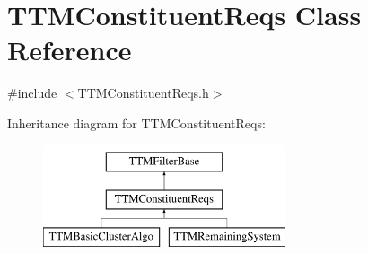 \hypertarget{classTTMConstituentReqs}{\section{T\-T\-M\-Constituent\-Reqs Class Reference}
\label{classTTMConstituentReqs}
}


{\ttfamily \#include $<$T\-T\-M\-Constituent\-Reqs.\-h$>$}

Inheritance diagram for T\-T\-M\-Constituent\-Reqs\-:\begin{figure}[H]
\begin{center}
\leavevmode
\includegraphics[height=3.000000cm]{classTTMConstituentReqs}
\end{center}
\end{figure}
